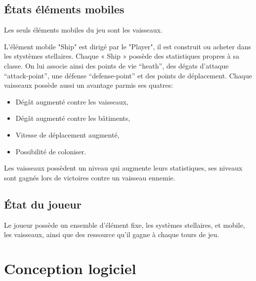 \subsection{États éléments mobiles}

Les seuls éléments mobiles du jeu sont les vaisseaux.

L'élément mobile "Ship" est dirigé par le "Player", il est construit ou acheter dans les stystèmes stellaires. Chaque « Ship » possède des statistiques propres à sa classe. On lui associe ainsi des points de vie “heath”, des dégats d'attaque “attack-point”, une défense “defense-point” et des points de déplacement. Chaque vaisseaux possède aussi un avantage parmis ses quatres:\\

\begin{itemize}
\item Dégât augmenté contre les vaisseaux,
\item Dégât augmenté contre les bâtiments,
\item Vitesse de déplacement augmenté,
\item Possibilité de coloniser.
\end{itemize}
Les vaisseaux possèdent un niveau qui augmente leurs statistiques, ses niveaux sont gagnés lors de victoires contre un vaisseau ennemie. 

\subsection{État du joueur}

Le joueur possède un ensemble d'élément fixe, les systèmes stellaires, et mobile, les vaisseaux, ainsi que des ressource qu'il gagne à chaque tours de jeu.

\section{Conception logiciel}

